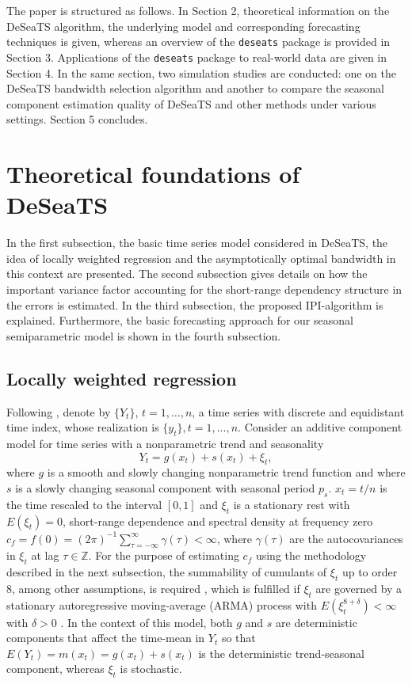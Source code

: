 The paper is structured as follows. In Section 2, theoretical information on the DeSeaTS algorithm, the underlying model and corresponding forecasting techniques is given, whereas an overview of the \texttt{deseats} package is provided in Section 3. Applications of the \texttt{deseats} package to real-world data are given in Section 4. In the same section, two simulation studies are conducted: one on the DeSeaTS bandwidth selection algorithm and another to compare the seasonal component estimation quality of DeSeaTS and other methods under various settings. Section 5 concludes.

\section{Theoretical foundations of DeSeaTS}\label{sec:theory}

In the first subsection, the basic time series model considered in DeSeaTS, the idea of locally weighted regression and the asymptotically optimal bandwidth in this context are presented. The second subsection gives details on how the important variance factor accounting for the short-range dependency structure in the errors is estimated. In the third subsection, the proposed IPI-algorithm is explained. Furthermore, the basic forecasting approach for our seasonal semiparametric model is shown in the fourth subsection.

\subsection{Locally weighted regression}\label{sec:lwr}

Following \citet{feng2013seasonal}, denote by \(\{Y_t\}\), \(t = 1,\dots,n\), a time series with discrete and equidistant time index, whose realization is \(\{y_t\}, t=1,\dots,n\). Consider an additive component model for time series with a nonparametric trend and seasonality
\begin{equation}
Y_t = g(x_t) + s(x_t) + \xi_t,
\label{eq:addModel}
\end{equation}
where \(g\) is a smooth and slowly changing nonparametric trend function and where \(s\) is a slowly changing seasonal component with seasonal period \(p_s\). \(x_t = t/n\) is the time rescaled to the interval \([0,1]\) and \(\xi_t\) is a stationary rest with \(E(\xi_t)=0\), short-range dependence and spectral density at frequency zero \(c_f=f(0)=(2\pi)^{-1}\sum_{\tau=-\infty}^{\infty}\gamma(\tau)<\infty\), where \(\gamma(\tau)\) are the autocovariances in \(\xi_t\) at lag \(\tau\in\mathbb{Z}\). For the purpose of estimating \(c_f\) using the methodology described in the next subsection, the summability of cumulants of \(\xi_t\) up to order 8, among other assumptions, is required \citep{buhlmann1996locally}, which is fulfilled if \(\xi_t\) are governed by a stationary autoregressive moving-average (ARMA) process with \(E\left(\xi_t^{8+\delta}\right)<\infty\) with \(\delta>0\) \citep{feng2020datadriven}. In the context of this model, both \(g\) and \(s\) are deterministic components that affect the time-mean in \({Y_t}\) so that \(E\left( Y_t \right) = m(x_t) = g(x_t)+s(x_t)\) is the deterministic trend-seasonal component, whereas \(\xi_t\) is stochastic.

